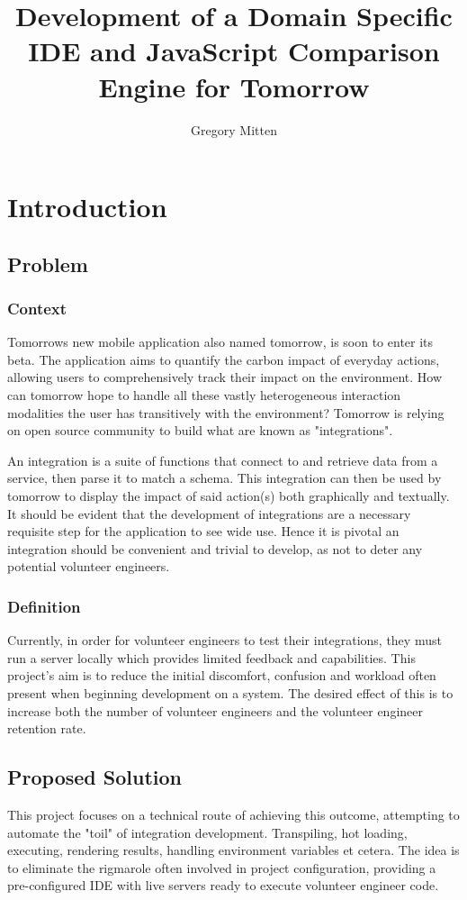 \documentclass[jou,apacite]{apa6}
\title{Development of a Domain Specific IDE and JavaScript Comparison Engine for Tomorrow}
\author{Gregory Mitten}
\affiliation{University of Sussex}
\begin{document}
\maketitle    
                        
\section{Introduction}
\subsection{Problem}
\subsubsection{Context}
Tomorrow\textquotesingle s new mobile application also named tomorrow, is soon to enter its beta. The application aims to quantify the carbon impact of everyday actions, allowing users to comprehensively track their impact on the environment. How can tomorrow hope to handle all these vastly heterogeneous interaction modalities the user has transitively with the environment? Tomorrow is relying on open source community to build what are known as "integrations".

An integration is a suite of functions that connect to and retrieve data from a service, then parse it to match a schema. This integration can then be used by tomorrow to display the impact of said action(s) both graphically and textually. It should be evident that the development of integrations are a necessary requisite step for the application to see wide use. Hence it is pivotal an integration should be convenient and trivial to develop, as not to deter any potential volunteer engineers.
\subsubsection{Definition}
Currently, in order for volunteer engineers to test their integrations, they must run a server locally which provides limited feedback and capabilities. This project’s aim is to reduce the initial discomfort, confusion and workload often present when beginning development on a system. The desired effect of this is to increase both the number of volunteer engineers and the volunteer engineer retention rate.

\subsection{Proposed Solution}
This project focuses on a technical route of achieving this outcome, attempting to automate the "toil" \cite{beyer_jones_petoff_murphy} of integration development.  Transpiling, hot loading, executing, rendering results, handling environment variables et cetera. The idea is to eliminate the rigmarole often involved in project configuration, providing a pre-configured IDE with live servers ready to execute volunteer engineer code. 
\end{document}
